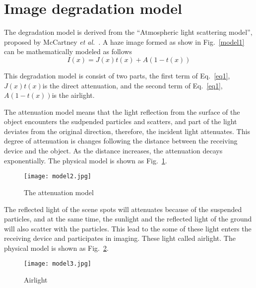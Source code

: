 \documentclass[10pt,twocolumn,letterpaper]{article}
\begin{document}
\section{Image degradation model}
 \par The degradation model is derived from the “Atmospheric light scattering model”, proposed by McCartney \emph{et al.}~\cite{Mccartney1976Optics}. A haze image formed as show in Fig.~\ref{model1} can be mathematically modeled as follows
\begin{equation}
I(x)=J(x)t(x)+A(1-t(x)) \label{eq1}
\end{equation}
\par This degradation model is consist of two parts, the first term of Eq.~\ref{eq1}, $J(x)t(x)$is the direct attenuation, and the second term of Eq.~\ref{eq1}, $A(1-t(x))$is the airlight.
\par The attenuation model means that the light reflection from the surface of the object encounters the sudpended particles and scatters, and part of the light deviates from the original direction, therefore, the incident light attenuates. This degree of attenuation is changes following the distance between the receiving device and the object. As the distance increases, the attenuation decays exponentially. The physical model is shown as Fig.~\ref{model2}.
\begin{figure}[htbp]
 \centering{}
\texttt{[image: model2.jpg]}\\
 \caption{The attenuation model}
\label{model2}
\end{figure}
\par The reflected light of the scene spots will attenuates because of the suspended particles, and at the same time, the sunlight and the reflected light of the ground will also scatter with the particles. This lead to the some of these light enters the receiving device and participates in imaging. These light called airlight. The physical model is shown as Fig.~\ref{model3}.  
\begin{figure}[htbp]
 \centering{}
\texttt{[image: model3.jpg]}\\
 \caption{Airlight}
\label{model3}
\end{figure} 
 
 
\end{document}
